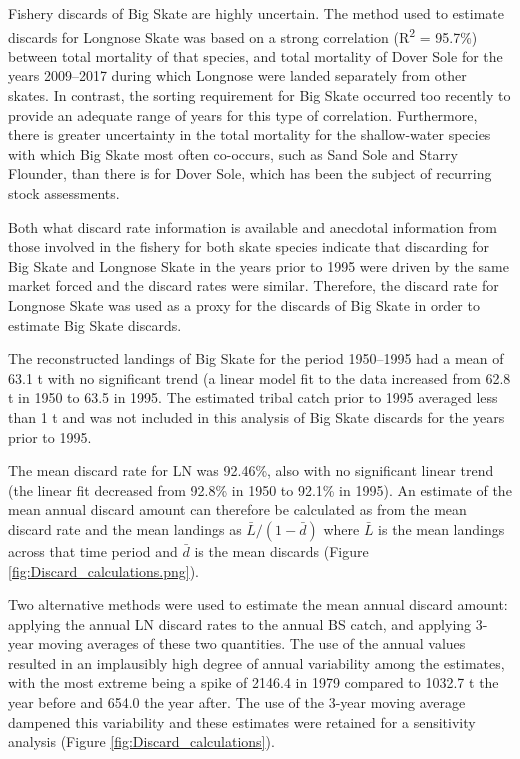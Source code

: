 \documentclass[12pt,]{article}
\begin{document}
Fishery discards of Big Skate are highly uncertain. The method used to
estimate discards for Longnose Skate was based on a strong correlation
(R\textsuperscript{2} = 95.7\%) between total mortality of that species,
and total mortality of Dover Sole for the years 2009--2017 during which
Longnose were landed separately from other skates. In contrast, the
sorting requirement for Big Skate occurred too recently to provide an
adequate range of years for this type of correlation. Furthermore, there
is greater uncertainty in the total mortality for the shallow-water
species with which Big Skate most often co-occurs, such as Sand Sole and
Starry Flounder, than there is for Dover Sole, which has been the
subject of recurring stock assessments.

Both what discard rate information is available and anecdotal
information from those involved in the fishery for both skate species
indicate that discarding for Big Skate and Longnose Skate in the years
prior to 1995 were driven by the same market forced and the discard
rates were similar. Therefore, the discard rate for Longnose Skate was
used as a proxy for the discards of Big Skate in order to estimate Big
Skate discards.

The reconstructed landings of Big Skate for the period 1950--1995 had a
mean of 63.1 t with no significant trend (a linear model fit to the data
increased from 62.8 t in 1950 to 63.5 in 1995. The estimated tribal
catch prior to 1995 averaged less than 1 t and was not included in this
analysis of Big Skate discards for the years prior to 1995.

The mean discard rate for LN was 92.46\%, also with no significant
linear trend (the linear fit decreased from 92.8\% in 1950 to 92.1\% in
1995). An estimate of the mean annual discard amount can therefore be
calculated as from the mean discard rate and the mean landings as
\(\bar{L} / (1 - \bar{d})\) where \(\bar{L}\) is the mean landings
across that time period and \(\bar{d}\) is the mean discards (Figure
\ref{fig:Discard_calculations.png}).

Two alternative methods were used to estimate the mean annual discard
amount: applying the annual LN discard rates to the annual BS catch, and
applying 3-year moving averages of these two quantities. The use of the
annual values resulted in an implausibly high degree of annual
variability among the estimates, with the most extreme being a spike of
2146.4 in 1979 compared to 1032.7 t the year before and 654.0 the year
after. The use of the 3-year moving average dampened this variability
and these estimates were retained for a sensitivity analysis (Figure
\ref{fig:Discard_calculations}).
\end{document}
